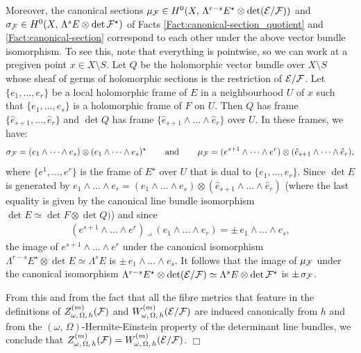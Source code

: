 \documentclass[12pt]{article}
\begin{document}
Moreover, the canonical sections $\mu_{{\cal F}}\in H^0(X,\,\Lambda^{r-s} E^\star\otimes\det({\cal E}/{\cal F}))$ and $\sigma_{{\cal F}}\in H^0(X,\,\Lambda^s E\otimes\det{\cal F}^\star)$ of Facts \ref{Fact:canonical-section_quotient} and \ref{Fact:canonical-section} correspond to each other under the above vector bundle isomorphism. To see this, note that everything is pointwise, so we can work at a pregiven point $x\in X\setminus S$. Let $Q$ be the holomorphic vector bundle over $X\setminus S$ whose sheaf of germs of holomorphic sections is the restriction of ${\cal E}/{\cal F}$. Let $\{e_1,\dots , e_r\}$ be a local holomorphic frame of $E$ in a neighbourhood $U$ of $x$ such that $\{e_1,\dots , e_s\}$ is a holomorphic frame of $F$ on $U$. Then $Q$ has frame $\{\hat{e}_{s+1},\dots , \hat{e}_r\}$ and $\det Q$ has frame $\{\hat{e}_{s+1}\wedge\dots\wedge\hat{e}_r\}$ over $U$. In these frames, we have: \begin{eqnarray*}\sigma_{\cal F} = (e_1\wedge\dots\wedge e_s)\otimes(e_1\wedge\dots\wedge e_s)^\star \hspace{5ex}\mbox{and}\hspace{5ex} \mu_{\cal F} = (e^{s+1}\wedge\dots\wedge e^r)\otimes(\hat{e}_{s+1}\wedge\dots\wedge\hat{e}_r),\end{eqnarray*} where $\{e^1,\dots , e^r\}$ is the frame of $E^\star$ over $U$ that is dual to $\{e_1,\dots , e_r\}$. Since $\det E$ is generated by $e_1\wedge\dots\wedge e_r = (e_1\wedge\dots\wedge e_s)\otimes(\hat{e}_{s+1}\wedge\dots\wedge\hat{e}_r)$ (where the last equality is given by the canonical line bundle isomorphism $\det E\simeq\det F\otimes\det Q)$) and since \begin{eqnarray*}(e^{s+1}\wedge\dots\wedge e^r)\lrcorner(e_1\wedge\dots\wedge e_r) = \pm\, e_1\wedge\dots\wedge e_s,\end{eqnarray*} the image of $e^{s+1}\wedge\dots\wedge e^r$ under the canonical isomorphism $\Lambda^{r-s}E^\star\otimes\det E\simeq\Lambda^sE$ is $\pm\, e_1\wedge\dots\wedge e_s$. It follows that the image of $\mu_{\cal F}$ under the canonical isomorphism $\Lambda^{r-s} E^\star\otimes\det({\cal E}/{\cal F})\simeq\Lambda^sE\otimes\det {\cal F}^\star$ is $\pm\,\sigma_{\cal F}$.

From this and from the fact that all the fibre metrics that feature in the definitions of $Z_{\omega,\,\Omega,\,h}^{(m)}({\cal F})$ and $W_{\omega,\,\Omega,\,h}^{(m)}({\cal E}/{\cal F})$ are induced canonically from $h$ and from the $(\omega,\,\Omega)$-Hermite-Einstein property of the determinant line bundles, we conclude that  $Z_{\omega,\,\Omega,\,h}^{(m)}({\cal F}) = W_{\omega,\,\Omega,\,h}^{(m)}({\cal E}/{\cal F})$. \hfill $\Box$
\end{document}
